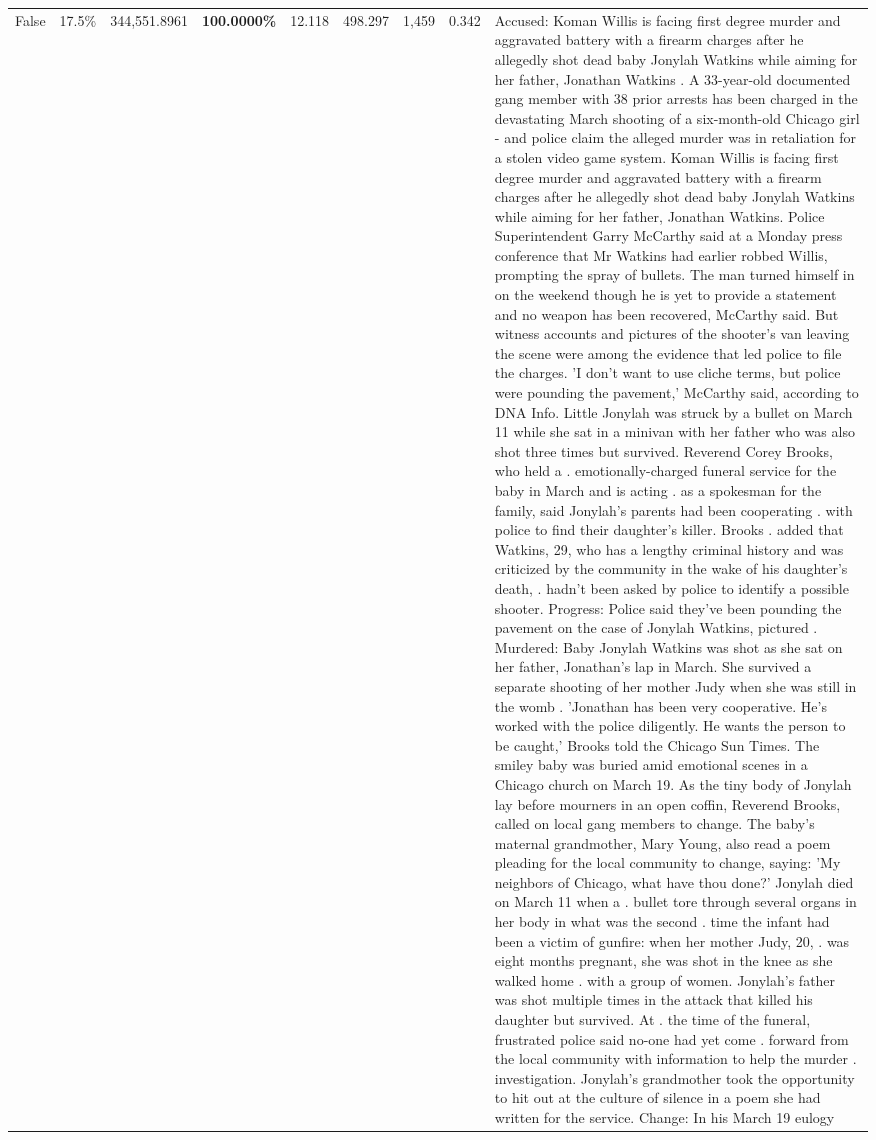 \begin{table}[H]
\begin{tabular}{lllrlllll}
False & 17.5\% & 344,551.8961 & \bfseries \color{red} 100.0000\% & 12.118 & 498.297 & 1,459 & 0.342 & Accused: Koman Willis is facing first degree murder and aggravated battery with a firearm charges after he allegedly shot dead baby Jonylah Watkins while aiming for her father, Jonathan Watkins . A 33-year-old documented gang member with 38 prior arrests has been charged in the devastating March shooting of a six-month-old Chicago girl - and police claim the alleged murder was in retaliation for a stolen video game system. Koman Willis is facing first degree murder and aggravated battery with a firearm charges after he allegedly shot dead baby Jonylah Watkins while aiming for her father, Jonathan Watkins. Police Superintendent Garry McCarthy said at a Monday press conference that Mr Watkins had earlier robbed Willis, prompting the spray of bullets. The man turned himself in on the weekend though he is yet to provide a statement and no weapon has been recovered, McCarthy said. But witness accounts and pictures of the shooter's van leaving the scene were among the evidence that led police to file the charges. 'I don't want to use cliche terms, but police were pounding the pavement,' McCarthy said, according to DNA Info. Little Jonylah was struck by a bullet on March 11 while she sat in a minivan with her father who was also shot three times but survived. Reverend Corey Brooks, who held a . emotionally-charged funeral service for the baby in March and is acting . as a spokesman for the family, said Jonylah's parents had been cooperating . with police to find their daughter's killer. Brooks . added that Watkins, 29, who has a lengthy criminal history and was criticized by the community in the wake of his daughter's death, . hadn't been asked by police to identify a possible shooter. Progress: Police said they've been pounding the pavement on the case of Jonylah Watkins, pictured . Murdered: Baby Jonylah Watkins was shot as she sat on her father, Jonathan's lap in March. She survived a separate shooting of her mother Judy when she was still in the womb . 'Jonathan has been very cooperative. He's worked with the police diligently. He wants the person to be caught,' Brooks told the Chicago Sun Times. The smiley baby was buried amid emotional scenes in a Chicago church on March 19. As the tiny body of Jonylah lay before mourners in an open coffin, Reverend Brooks, called on local gang members to change. The baby's maternal grandmother, Mary Young, also read a poem pleading for the local community to change, saying: 'My neighbors of Chicago, what have thou done?' Jonylah died on March 11 when a . bullet tore through several organs in her body in what was the second . time the infant had been a victim of gunfire: when her mother Judy, 20, . was eight months pregnant, she was shot in the knee as she walked home . with a group of women. Jonylah's father was shot multiple times in the attack that killed his daughter but survived. At . the time of the funeral, frustrated police said no-one had yet come . forward from the local community with information to help the murder . investigation. Jonylah's grandmother took the opportunity to hit out at the culture of silence in a poem she had written for the service. Change: In his March 19 eulogy 
\end{tabular}
\end{table}
